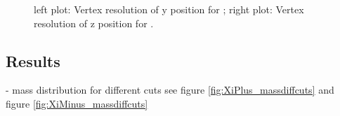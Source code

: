 		\begin{figure}
			\caption{left plot: Vertex resolution of y position for \anticascade; right plot: Vertex resolution of z position for \anticascade.}
			\label{fig:xi_vtxres_yz}
			
		\end{figure}
		
		
	\subsection*{Results}
	
	- mass distribution for different cuts see figure \ref{fig:XiPlus_massdiffcuts} and figure \ref{fig:XiMinus_massdiffcuts}
		
